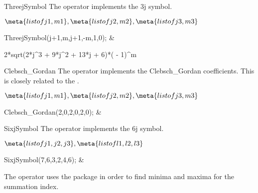 \begin{Operator}{ThreejSymbol}
The  operator implements the 3j symbol.

\begin{Syntax}

\(\meta{list of j1,m1},\meta{list of j2,m2},
\meta{list of j3,m3}\)

\end{Syntax}

\begin{Examples}

ThreejSymbol({j+1,m},{j+1,-m},{1,0}); & 

	{ 2*sqrt(2*j^3  + 9*j^2  + 13*j + 6)*( - 1)^m}\\

\end{Examples}
\end{Operator}

\begin{Operator}{Clebsch_Gordan}
The  operator implements the Clebsch\_Gordan
coefficients. This is closely related to the .

\begin{Syntax}

\(\meta{list of j1,m1},\meta{list of j2,m2},
\meta{list of j3,m3}\)

\end{Syntax}

\begin{Examples}
 Clebsch_Gordan({2,0},{2,0},{2,0});  & \\
\end{Examples}
\end{Operator}

\begin{Operator}{SixjSymbol}
The  operator implements the 6j symbol.
\begin{Syntax}

\(\meta{list of j1,j2,j3},\meta{list of l1,l2,l3}\)

\end{Syntax}
\begin{Examples}

SixjSymbol({7,6,3},{2,4,6}); & \\

\end{Examples}

\begin{Comments}
The operator  uses the  package in order
to find minima and maxima for the summation index.
\end{Comments}
\end{Operator}

